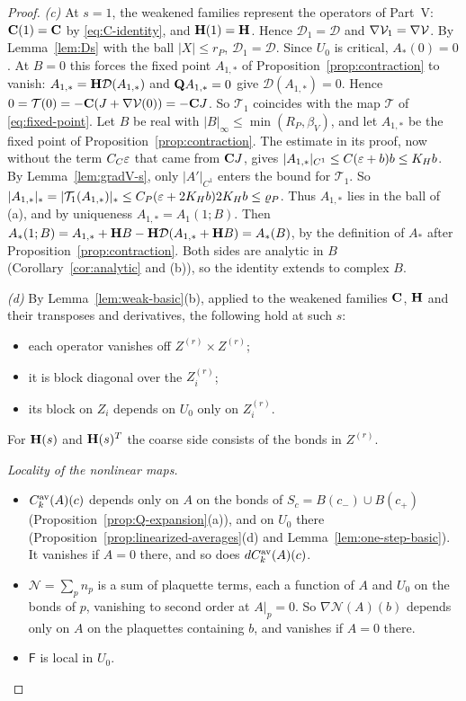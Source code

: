 \begin{proof}
\emph{(c)} At $s=1$, the weakened families represent the operators of Part~V: $\mathbf C(1)=\mathbf C$ by \eqref{eq:C-identity}, and $\mathbf H(1)=\mathbf H$. Hence $\mathcal D_1=\mathcal D$ and $\nabla\mathcal V_1=\nabla\mathcal V$. By Lemma~\ref{lem:Ds} with the ball $|X|\le r_P$, $\mathcal D_1=\mathcal D$. Since $U_0$ is critical, $A_*(0)=0$. At $B=0$ this forces the fixed point $A_{1,*}$ of Proposition~\ref{prop:contraction} to vanish: $A_{1,*}=\mathbf H\mathcal D(A_{1,*})$ and $\mathbf Q A_{1,*}=0$ give $\mathcal D(A_{1,*})=0$. Hence $0=\mathcal T(0)=-\mathbf C(J+\nabla\mathcal V(0))=-\mathbf C J$. So $\mathcal T_1$ coincides with the map $\mathcal T$ of \eqref{eq:fixed-point}. Let $B$ be real with $|B|_\infty\le\min(R_P,\beta_V)$, and let $A_{1,*}$ be the fixed point of Proposition~\ref{prop:contraction}. The estimate in its proof, now without the term $C_C\varepsilon$ that came from $\mathbf C J$, gives $|A_{1,*}|_{C^1}\le C(\varepsilon+b)b\le K_Hb$. By Lemma~\ref{lem:gradV-s}, only $|A'|_{C^1}$ enters the bound for $\mathcal T_1$. So $|A_{1,*}|_*=|\mathcal T_1(A_{1,*})|_*\le C_P(\varepsilon+2K_Hb)2K_Hb\le\varrho_P$. Thus $A_{1,*}$ lies in the ball of (a), and by uniqueness $A_{1,*}=A_1(1;B)$. Then $A_*(1;B)=A_{1,*}+\mathbf H B-\mathbf H\mathcal D(A_{1,*}+\mathbf H B)=A_*(B)$, by the definition of $A_*$ after Proposition~\ref{prop:contraction}. Both sides are analytic in $B$ (Corollary~\ref{cor:analytic} and (b)), so the identity extends to complex $B$.

\emph{(d)} By Lemma~\ref{lem:weak-basic}(b), applied to the weakened families $\mathbf C$, $\mathbf H$ and their transposes and derivatives, the following hold at such $s$:
\begin{itemize}
\item each operator vanishes off $Z^{(r)}\times Z^{(r)}$;
\item it is block diagonal over the $Z_i^{(r)}$;
\item its block on $Z_i$ depends on $U_0$ only on $Z_i^{(r)}$.
\end{itemize}
For $\mathbf H(s)$ and $\mathbf H(s)^T$ the coarse side consists of the bonds in $Z^{(r)}$.

\emph{Locality of the nonlinear maps.}
\begin{itemize}
\item $C^{\rm av}_k(A)(c)$ depends only on $A$ on the bonds of $S_c=B(c_-)\cup B(c_+)$ (Proposition~\ref{prop:Q-expansion}(a)), and on $U_0$ there (Proposition~\ref{prop:linearized-averages}(d) and Lemma~\ref{lem:one-step-basic}). It vanishes if $A=0$ there, and so does $dC^{\rm av}_k(A)(c)$.
\item $\mathcal N=\sum_pn_p$ is a sum of plaquette terms, each a function of $A$ and $U_0$ on the bonds of $p$, vanishing to second order at $A|_p=0$. So $\nabla\mathcal N(A)(b)$ depends only on $A$ on the plaquettes containing $b$, and vanishes if $A=0$ there.
\item $\mathsf F$ is local in $U_0$.
\end{itemize}


\end{proof}
